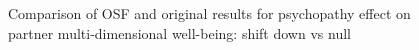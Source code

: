 \documentclass[
  singlecolumn]{article}
\begin{document}
\begin{figure}


\caption{\label{fig-results-psychopathy-partner-down-comparison}Comparison
of OSF and original results for psychopathy effect on partner
multi-dimensional well-being: shift down vs null}

\end{figure}%

\newpage{}
\end{document}
